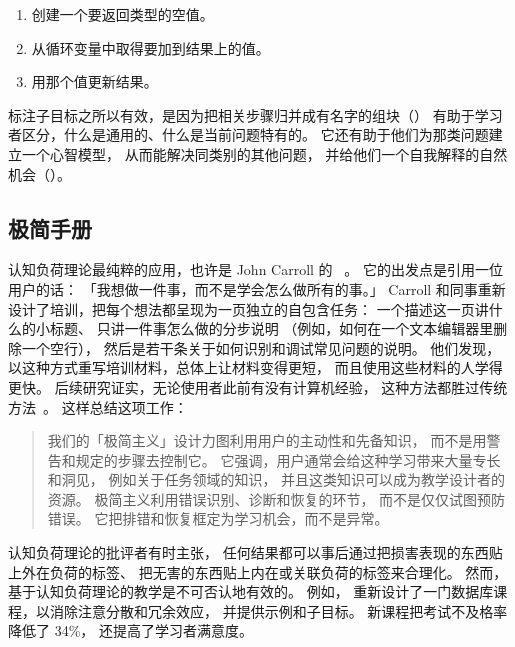 \begin{enumerate}

\item
  创建一个要返回类型的空值。

\item
  从循环变量中取得要加到结果上的值。

\item
  用那个值更新结果。

\end{enumerate}

标注子目标之所以有效，是因为把相关步骤归并成有名字的组块（）
有助于学习者区分，什么是通用的、什么是当前问题特有的。
它还有助于他们为那类问题建立一个心智模型，
从而能解决同类别的其他问题，
并给他们一个自我解释的自然机会（）。

\subsection*{极简手册}

认知负荷理论最纯粹的应用，也许是 John Carroll 的
~\cite{Carr1987,Carr2014}。
它的出发点是引用一位用户的话：
「我想做一件事，而不是学会怎么做所有的事。」
Carroll 和同事重新设计了培训，把每个想法都呈现为一页独立的自包含任务：
一个描述这一页讲什么的小标题、
只讲一件事怎么做的分步说明
（例如，如何在一个文本编辑器里删除一个空行），
然后是若干条关于如何识别和调试常见问题的说明。
他们发现，以这种方式重写培训材料，总体上让材料变得更短，
而且使用这些材料的人学得更快。
后续研究证实，无论使用者此前有没有计算机经验，
这种方法都胜过传统方法~\cite{Lazo1993}。
\cite{Carr2014}这样总结这项工作：

\begin{quote}

  我们的「极简主义」设计力图利用用户的主动性和先备知识，
  而不是用警告和规定的步骤去控制它。
  它强调，用户通常会给这种学习带来大量专长和洞见，
  例如关于任务领域的知识，
  并且这类知识可以成为教学设计者的资源。
  极简主义利用错误识别、诊断和恢复的环节，
  而不是仅仅试图预防错误。
  它把排错和恢复框定为学习机会，而不是异常。

\end{quote}


认知负荷理论的批评者有时主张，
任何结果都可以事后通过把损害表现的东西贴上外在负荷的标签、
把无害的东西贴上内在或关联负荷的标签来合理化。
然而，
基于认知负荷理论的教学是不可否认地有效的。
例如，
\cite{Maso2016}重新设计了一门数据库课程，以消除注意分散和冗余效应，
并提供示例和子目标。
新课程把考试不及格率降低了 34\%，
还提高了学习者满意度。

